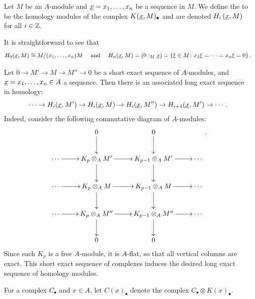 \begin{definition}
    Let $M$ be an $A$-module and $\underline{x} = x_1,\dots,x_n$ be a sequence in $M$. We define the  to be the homology modules of the complex $K(\underline{x}, M)_\bullet$ and are denoted $H_i\left(\underline{x}, M\right)$ for all $i\in\mathbb{Z}$.
\end{definition}

It is straightforward to see that 
\begin{equation*}
    H_0(\underline{x}, M)\cong M/(x_1,\dots,x_n)M\quad\text{ and }\quad H_n(\underline{x}, M) = \left(0 :_M \underline{x}\right) = \left\{\xi\in M\colon x_1\xi = \dots = x_n\xi = 0\right\}.
\end{equation*}

\begin{interlude}
    Let $0\to M'\to M\to M''\to 0$ be a short exact sequence of $A$-modules, and $\underline{x} = x_1,\dots,x_n\in A$ a sequence. Then there is an associated long exact sequence in homology: 
    \begin{equation*}
        \cdots\to H_i(\underline{x}, M')\to H_i(\underline{x}, M)\to H_i(\underline{x}, M'')\to H_{i + 1}(\underline{x}, M')\to \cdots.
    \end{equation*}
    Indeed, consider the following commutative diagram of $A$-modules: 
    \begin{equation*}
        \xymatrix {
            & 0\ar[d] & 0\ar[d] & \\
            \cdots\ar[r] & K_p\otimes_A M'\ar[r]\ar[d] & K_{p - 1}\otimes_A M'\ar[r]\ar[d] & \cdots\\
            \cdots\ar[r] & K_p\otimes_A M\ar[r]\ar[d] & K_{p - 1}\otimes_A M\ar[r]\ar[d] & \cdots\\
            \cdots\ar[r] & K_p\otimes_A M''\ar[r]\ar[d] & K_{p - 1}\otimes_A M''\ar[r]\ar[d] & \cdots\\
            & 0 & 0 &
        }.
    \end{equation*}
    Since each $K_p$ is a free $A$-module, it is $A$-flat, so that all vertical columns are exact. This short exact sequence of complexes induces the desired long exact sequence of homology modules.
\end{interlude}

For a complex $C_\bullet$ and $x\in A$, let $C(x)_\bullet$ denote the complex $C_\bullet\otimes K(x)_\bullet$.

